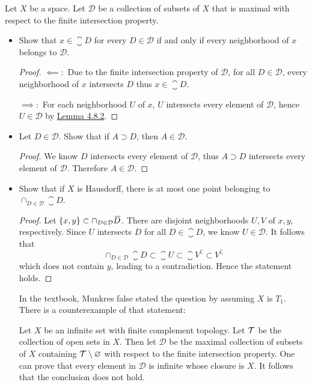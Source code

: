 \documentclass[12pt,a4paper]{article}
\begin{document}
    \begin{ex}
        Let $X$ be a space. Let $\mathcal{D}$ be a collection of subsets of $X$ that is maximal with respect to the finite intersection property.
        \begin{itemize}
            \item Show that $x\in\closure{D}$ for every $D\in \mathcal{D}$ if and only if every neighborhood of $x$ belongs to $\mathcal{D}$.
            \begin{proof}
                $\impliedby:$ Due to the finite intersection property of $\mathcal{D}$, for all $D\in\mathcal{D}$, every neighborhood of $x$ intersects $D$ thus $x\in\closure{D}$.

                $\implies:$ For each neighborhood $U$ of $x$, $U$ intersects every element of $\mathcal{D}$, hence $U\in\mathcal{D}$ by \hyperref[4.8.2]{Lemma 4.8.2}.
            \end{proof}
            \item Let $D\in\mathcal{D}$. Show that if $A\supset D$, then $A\in\mathcal{D}$.
            \begin{proof}
                We know $D$ intersects every element of $\mathcal{D}$, thus $A\supset D$ intersects every element of $\mathcal{D}$. Therefore $A\in\mathcal{D}$.
            \end{proof}
            \item Show that if $X$ is Hausdorff, there is at most one point belonging to $\cap_{D\in\mathcal{D}}\closure{D}$.
            \begin{proof}
                Let $\left\{x,y\right\}\subset\cap_{D\in\mathcal{D}}{}\mkern3mu\overline{\mkern-3muD}$. There are disjoint neighborhoods $U,V$ of $x,y$, respectively. Since $U$ intersects $D$ for all $D\in\closure{D}$, we know $U\in\mathcal{D}$. It follows that
                $$
                \cap_{D\in\mathcal{D}}\closure{D}\subset \closure{U}\subset\closure{V^\complement}\subset V^\complement
                $$
                which does not contain $y$, leading to a contradiction. Hence the statement holds.
            \end{proof}
            \begin{remark}
                In the textbook, Munkres false stated the question by assuming $X$ is $T_1$. There is a counterexample of that statement:

                Let $X$ be an infinite set with finite complement topology. Let $\mathcal{T}$ be the collection of open sets in $X$. Then let $\mathcal{D}$ be the maximal collection of subsets of $X$ containing $\mathcal{T}\setminus\varnothing$ with respect to the finite intersection property. One can prove that every element in $\mathcal{D}$ is infinite whose closure is $X$. It follows that the conclusion does not hold.
            \end{remark}
        \end{itemize}
    \end{ex}
    \hfill
\end{document}
